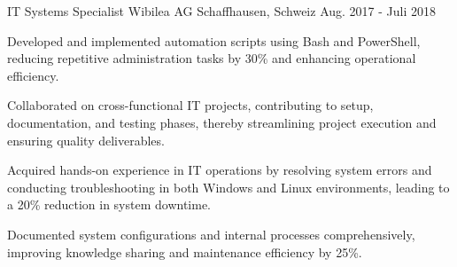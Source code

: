 \begin{cventries}
\cventry
  {IT Systems Specialist}
  {Wibilea AG}
  {Schaffhausen, Schweiz}
  {Aug. 2017 - Juli 2018}
  {
    \begin{cvitems}
\item {Developed and implemented automation scripts using Bash and PowerShell, reducing repetitive administration tasks by 30\% and enhancing operational efficiency.}
\item {Collaborated on cross-functional IT projects, contributing to setup, documentation, and testing phases, thereby streamlining project execution and ensuring quality deliverables.}
\item {Acquired hands-on experience in IT operations by resolving system errors and conducting troubleshooting in both Windows and Linux environments, leading to a 20\% reduction in system downtime.}
\item {Documented system configurations and internal processes comprehensively, improving knowledge sharing and maintenance efficiency by 25\%.}
\end{cvitems}
  }
\end{cventries}
